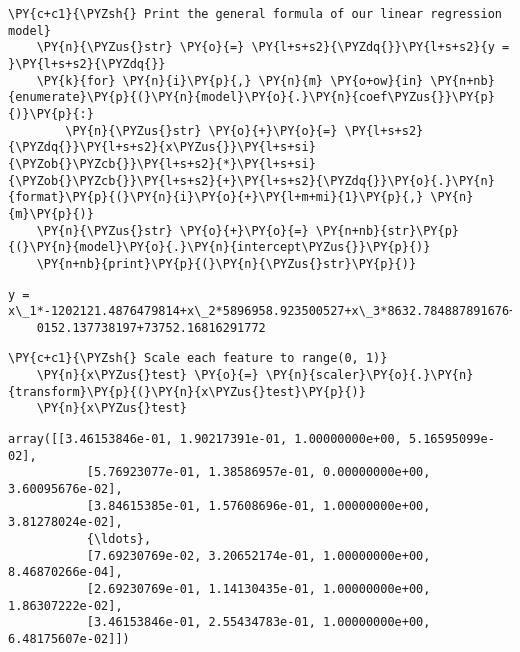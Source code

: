         \begin{tcolorbox}[breakable, size=fbox, boxrule=1pt, pad at break*=1mm,colback=cellbackground, colframe=cellborder]
    \begin{Verbatim}[commandchars=\\\{\}]
    \PY{c+c1}{\PYZsh{} Print the general formula of our linear regression model}
    \PY{n}{\PYZus{}str} \PY{o}{=} \PY{l+s+s2}{\PYZdq{}}\PY{l+s+s2}{y = }\PY{l+s+s2}{\PYZdq{}}
    \PY{k}{for} \PY{n}{i}\PY{p}{,} \PY{n}{m} \PY{o+ow}{in} \PY{n+nb}{enumerate}\PY{p}{(}\PY{n}{model}\PY{o}{.}\PY{n}{coef\PYZus{}}\PY{p}{)}\PY{p}{:}
        \PY{n}{\PYZus{}str} \PY{o}{+}\PY{o}{=} \PY{l+s+s2}{\PYZdq{}}\PY{l+s+s2}{x\PYZus{}}\PY{l+s+si}{\PYZob{}\PYZcb{}}\PY{l+s+s2}{*}\PY{l+s+si}{\PYZob{}\PYZcb{}}\PY{l+s+s2}{+}\PY{l+s+s2}{\PYZdq{}}\PY{o}{.}\PY{n}{format}\PY{p}{(}\PY{n}{i}\PY{o}{+}\PY{l+m+mi}{1}\PY{p}{,} \PY{n}{m}\PY{p}{)}
    \PY{n}{\PYZus{}str} \PY{o}{+}\PY{o}{=} \PY{n+nb}{str}\PY{p}{(}\PY{n}{model}\PY{o}{.}\PY{n}{intercept\PYZus{}}\PY{p}{)}
    \PY{n+nb}{print}\PY{p}{(}\PY{n}{\PYZus{}str}\PY{p}{)}
    \end{Verbatim}
    \end{tcolorbox}
    
        \begin{Verbatim}[commandchars=\\\{\}]
    y = x\_1*-1202121.4876479814+x\_2*5896958.923500527+x\_3*8632.784887891676+x\_4*-335
    0152.137738197+73752.16816291772
        \end{Verbatim}
    
        \begin{tcolorbox}[breakable, size=fbox, boxrule=1pt, pad at break*=1mm,colback=cellbackground, colframe=cellborder]
    \begin{Verbatim}[commandchars=\\\{\}]
    \PY{c+c1}{\PYZsh{} Scale each feature to range(0, 1)}
    \PY{n}{x\PYZus{}test} \PY{o}{=} \PY{n}{scaler}\PY{o}{.}\PY{n}{transform}\PY{p}{(}\PY{n}{x\PYZus{}test}\PY{p}{)}
    \PY{n}{x\PYZus{}test}
    \end{Verbatim}
    \end{tcolorbox}
    
                \begin{tcolorbox}[breakable, size=fbox, boxrule=.5pt, pad at break*=1mm, opacityfill=0]
    \begin{Verbatim}[commandchars=\\\{\}]
    array([[3.46153846e-01, 1.90217391e-01, 1.00000000e+00, 5.16595099e-02],
           [5.76923077e-01, 1.38586957e-01, 0.00000000e+00, 3.60095676e-02],
           [3.84615385e-01, 1.57608696e-01, 1.00000000e+00, 3.81278024e-02],
           {\ldots},
           [7.69230769e-02, 3.20652174e-01, 1.00000000e+00, 8.46870266e-04],
           [2.69230769e-01, 1.14130435e-01, 1.00000000e+00, 1.86307222e-02],
           [3.46153846e-01, 2.55434783e-01, 1.00000000e+00, 6.48175607e-02]])
    \end{Verbatim}
    \end{tcolorbox}
            
